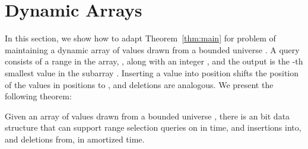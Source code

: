 \documentclass{llncs}
\begin{document}
\section{Dynamic Arrays\label{sec:dynarray}}

In this section, we show how to adapt Theorem~\ref{thm:main} for
problem of maintaining a dynamic array  of values drawn from a
bounded universe .  A query consists of a range in the
array, , along with an integer , and the output is the
-th smallest value in the subarray .  Inserting a value
into position  shifts the position of the values in positions
 to , and deletions are analogous.  We present
the following theorem:

\begin{theorem}
\label{thm:dynarray}
Given an array  of values drawn from a bounded universe
, there is an  bit
data structure that can support range selection queries on  in
 time,
and insertions into, and deletions from,  in  amortized time.
\end{theorem}
\end{document}
